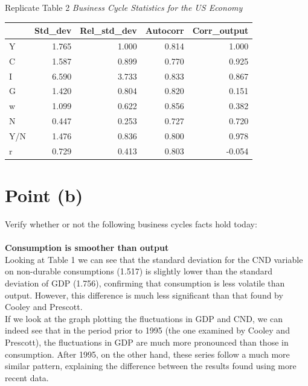 \documentclass[12pt]{article}
\begin{document}
\clearpage
Replicate Table 2 \textit{Business Cycle Statistics for the US Economy}
\begin{table}[h]
\centering
\begin{tabular}{lrrrr}
\toprule
{} &  Std\_dev &  Rel\_std\_dev &  Autocorr &  Corr\_output \\
\midrule
Y   &    1.765 &        1.000 &     0.814 &        1.000 \\
C   &    1.587 &        0.899 &     0.770 &        0.925 \\
I   &    6.590 &        3.733 &     0.833 &        0.867 \\
G   &    1.420 &        0.804 &     0.820 &        0.151 \\
w   &    1.099 &        0.622 &     0.856 &        0.382 \\
N   &    0.447 &        0.253 &     0.727 &        0.720 \\
Y/N &    1.476 &        0.836 &     0.800 &        0.978 \\
r   &    0.729 &        0.413 &     0.803 &       -0.054 \\
\bottomrule
\end{tabular}
\end{table}

\newpage
\section{Point (b)}
Verify whether or not the following business cycles facts hold today:\\\\
\textbf{Consumption is smoother than output}\\
Looking at Table 1 we can see that the standard deviation for the CND variable on non-durable consumptions (1.517) is slightly lower than the standard deviation of GDP (1.756), confirming that consumption is less volatile than output.  However, this difference is much less significant than that found by Cooley and Prescott.\\
If we look at the graph plotting the fluctuations in GDP and CND, we can indeed see that in the period prior to 1995 (the one examined by Cooley and Prescott), the fluctuations in GDP are much more pronounced than those in consumption. After 1995, on the other hand, these series follow a much more similar pattern, explaining the difference between the results found using more recent data. 
\end{document}
